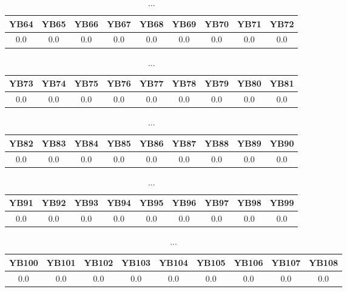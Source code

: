 \documentclass[]{article}
\begin{document}
\begin{table}[h]
      \centering
      \begin{tabular}{|c|c|c|c|c|c|c|c|c|}
            \hline
            YB64 & YB65 & YB66 & YB67 & YB68 & YB69 & YB70 & YB71 & YB72 \\
            \hline
            0.0  & 0.0  & 0.0  & 0.0  & 0.0  & 0.0  & 0.0  & 0.0  & 0.0  \\
            \hline
      \end{tabular}
      \caption{...}
\end{table}
\begin{table}[h]
      \centering
      \begin{tabular}{|c|c|c|c|c|c|c|c|c|}
            \hline
            YB73 & YB74 & YB75 & YB76 & YB77 & YB78 & YB79 & YB80 & YB81 \\
            \hline
            0.0  & 0.0  & 0.0  & 0.0  & 0.0  & 0.0  & 0.0  & 0.0  & 0.0  \\
            \hline
      \end{tabular}
      \caption{...}
\end{table}
\begin{table}[h]
      \centering
      \begin{tabular}{|c|c|c|c|c|c|c|c|c|}
            \hline
            YB82 & YB83 & YB84 & YB85 & YB86 & YB87 & YB88 & YB89 & YB90 \\
            \hline
            0.0  & 0.0  & 0.0  & 0.0  & 0.0  & 0.0  & 0.0  & 0.0  & 0.0  \\
            \hline
      \end{tabular}
      \caption{...}
\end{table}
\begin{table}[h]
      \centering
      \begin{tabular}{|c|c|c|c|c|c|c|c|c|}
            \hline
            YB91 & YB92 & YB93 & YB94 & YB95 & YB96 & YB97 & YB98 & YB99 \\
            \hline
            0.0  & 0.0  & 0.0  & 0.0  & 0.0  & 0.0  & 0.0  & 0.0  & 0.0  \\
            \hline
      \end{tabular}
      \caption{...}
\end{table}
\begin{table}[h]
      \centering
      \begin{tabular}{|c|c|c|c|c|c|c|c|c|}
            \hline
            YB100 & YB101 & YB102 & YB103 & YB104 & YB105 & YB106 & YB107 & YB108 \\
            \hline
            0.0   & 0.0   & 0.0   & 0.0   & 0.0   & 0.0   & 0.0   & 0.0   & 0.0   \\
            \hline
      \end{tabular}
      \caption{...}
\end{table}
\end{document}
